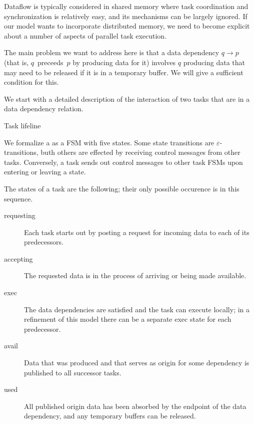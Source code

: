 

Dataflow is typically considered in shared
memory where task coordination and synchronization is
relatively easy, and its mechanisms can be largely ignored.
If our model wants to incorporate distributed memory,
we need to become explicit about a number of aspects
of parallel task execution. 

The main problem we want 
to address here is that a data dependency $q\rightarrow p$
(that is, $q$~preceeds~$p$ by producing data for it)
involves $q$ producing data that may need to be released
if it is in a temporary buffer. We will give a 
sufficient condition for this.

We start with a detailed description of the interaction 
of two tasks that are in a data dependency relation.

 {Task lifeline}
\label{sec:tasklife}

We formalize a  as a \ac{FSM} with five states.
Some state transitions are $\varepsilon$-transitions, buth others
are effected by receiving control messages from other tasks.
Conversely, a task sends out control messages to other task \acp{FSM}
upon entering or leaving a state.

The states of a task are the following; their only possible occurence
is in this sequence.
\begin{description}
  \item[requesting] Each task starts out by posting a request for incoming
    data to each of its predecessors.
  \item[accepting] The requested data is in the process of arriving or
    being made available.
  \item[exec] The data dependencies are satisfied and the task can
    execute locally; in a refinement of this model there can be a
    separate exec state for each predecessor.
  \item[avail] Data that was produced and that serves as origin for
    some dependency is published to all successor tasks.
  \item[used] All published origin data has been absorbed by the endpoint of the
    data dependency, and any temporary buffers can be released.
\end{description}

